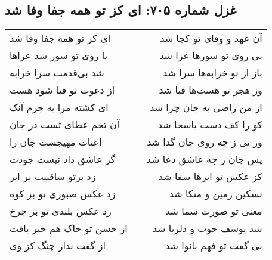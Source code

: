 \begin{center}
\section*{غزل شماره ۷۰۵: ای کز تو همه جفا وفا شد}
\label{sec:0705}
\begin{longtable}{l p{0.5cm} r}
ای کز تو همه جفا وفا شد
&&
آن عهد و وفای تو کجا شد
\\
با روی تو سور شد عزاها
&&
بی روی تو سورها عزا شد
\\
شد بی‌قدمت سرا خرابه
&&
باز از تو خرابه‌ها سرا شد
\\
از دعوت تو فنا شود هست
&&
وز هجر تو هست‌ها فنا شد
\\
ای کشته مرا به جرم آنک
&&
از من راضی به جان چرا شد
\\
آن تخم عطای تست در جان
&&
کو را کف دست باسخا شد
\\
اعنات مهیجست جان را
&&
ور نی ز چه روی جان گدا شد
\\
گر عاشق داد نیست جودت
&&
پس جان ز چه عاشق دعا شد
\\
زد پرتو ساقییت بر ابر
&&
کز عکس تو ابرها سقا شد
\\
زد عکس صبوری تو بر کوه
&&
تسکین زمین و متکا شد
\\
زد عکس بلندی تو بر چرخ
&&
معنی تو صورت سما شد
\\
از حسن تو خاک هم خبر یافت
&&
شد یوسف خوب و دلربا شد
\\
از گفت بدار چنگ کز وی
&&
بی گفت تو فهم بانوا شد
\\
\end{longtable}
\end{center}
